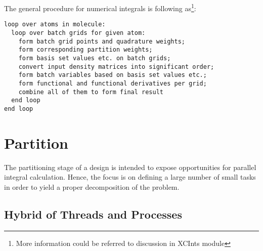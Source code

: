 The general procedure for numerical integrals is following as\footnote{More
information could be referred to discussion in XCInts module}:
\begin{verbatim}
loop over atoms in molecule:
  loop over batch grids for given atom:
    form batch grid points and quadrature weights;
    form corresponding partition weights; 
    form basis set values etc. on batch grids;
    convert input density matrices into significant order;
    form batch variables based on basis set values etc.;
    form functional and functional derivatives per grid;
    combine all of them to form final result
  end loop
end loop
\end{verbatim}

\section{Partition}

The partitioning stage of a design is intended to expose opportunities for 
parallel integral calculation. Hence, the focus is on defining a large number 
of small tasks in order to yield a proper decomposition of the problem.

\subsection{Hybrid of Threads and Processes}
\label{hybrid_para_ints}
%
%

